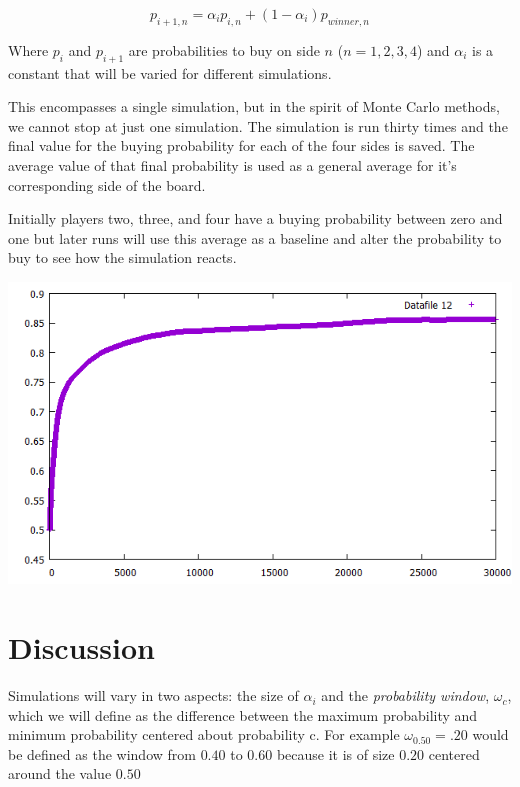 \documentclass{article}
\begin{document}
\begin{equation}
    \label{probability_adjustment}
    p_{i+1,n} = \alpha_i p_{i,n} + (1-\alpha_i)p_{winner,n}
\end{equation}

Where $p_i$ and $p_{i+1}$ are probabilities to buy on side $n$ ($n = 1,2,3,4$) and $\alpha_i$ is a constant that will be varied for different simulations.

This encompasses a single simulation, but in the spirit of Monte Carlo methods, we cannot stop at just one simulation.  The simulation is run thirty times and the final value for the buying probability for each of the four sides is saved.  The average value of that final probability is used as a general average for it's corresponding side of the board.

Initially players two, three, and four have a buying probability between zero and one but later runs will use this average as a baseline and alter the probability to buy to see how the simulation reacts.

\begin{center}
\includegraphics[width = \textwidth]{average}
\end{center}

\section{Discussion}

Simulations will vary in two aspects:  the size of $\alpha_i$ and the \textit{probability window}, $\omega_c$, which we will define as the difference between the maximum probability and minimum probability centered about probability c.  For example $\omega_{0.50} = .20$ would be defined as the window from $0.40$ to $0.60$ because it is of size $0.20$ centered around the value $0.50$
\end{document}
